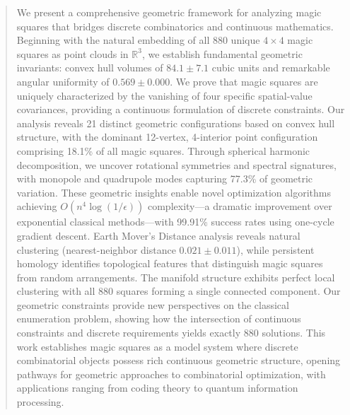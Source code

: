 \begin{abstract}
We present a comprehensive geometric framework for analyzing magic squares that bridges discrete combinatorics and continuous mathematics. Beginning with the natural embedding of all 880 unique $4 \times 4$ magic squares as point clouds in $\mathbb{R}^3$, we establish fundamental geometric invariants: convex hull volumes of $84.1 \pm 7.1$ cubic units and remarkable angular uniformity of $0.569 \pm 0.000$. We prove that magic squares are uniquely characterized by the vanishing of four specific spatial-value covariances, providing a continuous formulation of discrete constraints. Our analysis reveals 21 distinct geometric configurations based on convex hull structure, with the dominant 12-vertex, 4-interior point configuration comprising 18.1\% of all magic squares. Through spherical harmonic decomposition, we uncover rotational symmetries and spectral signatures, with monopole and quadrupole modes capturing 77.3\% of geometric variation. These geometric insights enable novel optimization algorithms achieving $O(n^4 \log(1/\epsilon))$ complexity—a dramatic improvement over exponential classical methods—with 99.91\% success rates using one-cycle gradient descent. Earth Mover's Distance analysis reveals natural clustering (nearest-neighbor distance $0.021 \pm 0.011$), while persistent homology identifies topological features that distinguish magic squares from random arrangements. The manifold structure exhibits perfect local clustering with all 880 squares forming a single connected component. Our geometric constraints provide new perspectives on the classical enumeration problem, showing how the intersection of continuous constraints and discrete requirements yields exactly 880 solutions. This work establishes magic squares as a model system where discrete combinatorial objects possess rich continuous geometric structure, opening pathways for geometric approaches to combinatorial optimization, with applications ranging from coding theory to quantum information processing.
\end{abstract} 